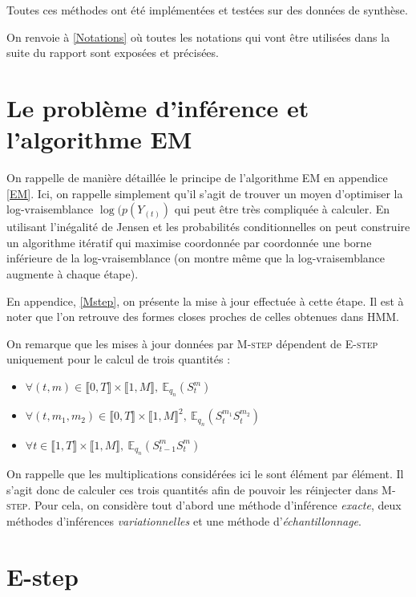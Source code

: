 \documentclass[10pt,a4paper]{article}
\newcommand{\hmm}{\textsc{HMM}}
\newcommand{\Estep}{\textsc{E-step}}
\newcommand{\Mstep}{\textsc{M-step}}
\newcommand{\EM}{\textsc{EM}}
\begin{document}
Toutes ces méthodes ont été implémentées et testées sur des données de synthèse.

On renvoie à \ref{Notations} où toutes les notations qui vont être utilisées dans la suite du rapport 
sont exposées et précisées.


\section{Le problème d'inférence et l'algorithme EM}

On rappelle de manière détaillée le principe de l'algorithme \EM{} en appendice \ref{EM}. 
Ici, on rappelle simplement qu'il s'agit de trouver un moyen d'optimiser la log-vraisemblance
$\log(p(Y_{(t)})$ qui peut être très compliquée à calculer. En utilisant l'inégalité de Jensen
et les probabilités conditionnelles on peut construire un algorithme itératif qui maximise coordonnée
par coordonnée une borne inférieure de la log-vraisemblance (on montre même que la log-vraisemblance augmente à chaque étape).

En appendice, \ref{Mstep}, on présente la mise à jour effectuée à cette étape.
Il est à noter que l'on retrouve des formes closes proches de celles obtenues dans \hmm{}.

On remarque que les mises à jour données par \Mstep{} dépendent de \Estep{} 
uniquement pour le calcul de trois quantités :
\begin{itemize}
\item $\forall (t,m) \in \llbracket 0, T\rrbracket \times \llbracket 1,M 
\rrbracket, \ \mathbb{E}_{q_n}(S_t^m) $
\item $\forall (t,m_1,m_2) \in \llbracket 0, T\rrbracket \times \llbracket 
1,M\rrbracket^2, \ \mathbb{E}_{q_n}(S_t^{m_1}S_t^{m_2}) $
\item $\forall t \in \llbracket 1,T \rrbracket \times \llbracket 1,M 
\rrbracket, \ \mathbb{E}_{q_n}(S_{t-1}^mS_t^{m})$
\end{itemize}
On rappelle que les multiplications considérées ici le sont élément par 
élément. Il s'agit donc de calculer ces trois quantités afin de pouvoir les 
réinjecter dans \Mstep. Pour cela, on considère tout d'abord une méthode
d'inférence \emph{exacte}, deux méthodes d'inférences \emph{variationnelles} et
une méthode d'\emph{échantillonnage}.

\section{E-step}
\end{document}
